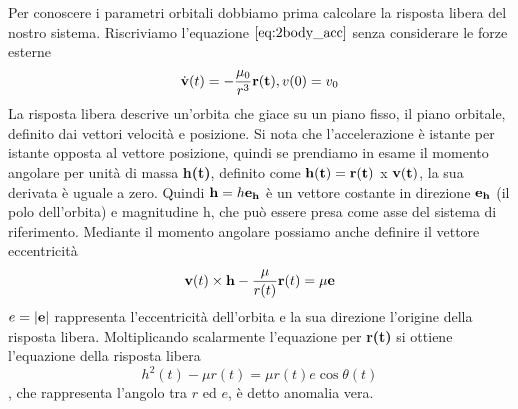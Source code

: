 Per conoscere i parametri orbitali dobbiamo prima calcolare la risposta libera
del nostro sistema. Riscriviamo l'equazione $\ref{eq:2body_acc}$ senza
considerare le forze esterne
\begin{equation}
\dot{\bf v}(t)=-\frac{\mu_0}{r^3}{\bf r(t)}, v(0)=v_0
\end{equation}
La risposta libera descrive un'orbita che giace su un piano fisso, il piano
orbitale, definito dai vettori velocità e posizione. Si nota che l'accelerazione
è istante per istante opposta al vettore posizione, quindi se prendiamo in esame
il momento angolare per unità di massa {\bf h(t)}, definito come ${\bf
h(t)}={\bf r(t)}$ x ${\bf v(t)}$, la sua derivata è uguale a zero. Quindi ${\bf
h}=h{\bf e_h}$ è un vettore costante in direzione ${\bf e_h}$ (il polo dell'orbita) e
magnitudine h, che può essere presa come asse del sistema di riferimento.
Mediante il momento angolare possiamo anche definire il vettore eccentricità
\[ {\bf v}(t) \times {\bf h} - \frac{\mu}{r(t)}{\bf r}(t)=\mu{\bf e} \]
$e=|{\bf e}|$ rappresenta  l'eccentricità dell'orbita e la sua direzione
l'origine della risposta libera. Moltiplicando scalarmente l'equazione per {\bf
r(t)} si ottiene l'equazione della risposta libera
\begin{equation}
h^2(t)-\mu r(t)=\mu r(t)e \cos{\theta(t)}
\end{equation}
\theta, che rappresenta l'angolo tra $r$ ed $e$, è detto anomalia vera.
